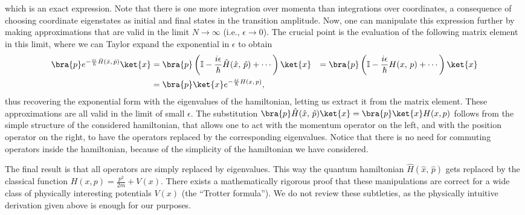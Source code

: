 which is an exact expression. Note that there is one more integration over momenta than integrations over coordinates, a consequence of choosing coordinate eigenstates as initial and final states in the transition amplitude. Now, one can manipulate this expression further by making approximations that are valid in the limit \(N \to \infty\) (i.e., \(\epsilon \to  0\)). The crucial point is the evaluation of the following matrix element in this limit, where we can Taylor expand the exponential in \(\epsilon\) to obtain
\[
    \begin{aligned}
        \bra{p} e^{-\frac{i\epsilon}{\hbar}\hat{H}(\hat{x},\,\hat{p})}\ket{x} & = \bra{p} \left(\mathbb{I} - \frac{i \epsilon}{\hbar} \hat{H}(\hat{x},\,\hat{p}) + \cdots \right) \ket{x}
                                                                              & = \bra{p} \left(\mathbb{I} - \frac{i \epsilon}{\hbar} H(x,\,p) + \cdots \right) \ket{x}                   \\
                                                                              & = \bra{p}\ket{x} e^{-\frac{i \epsilon}{\hbar} H(x,\,p)},
    \end{aligned}
\]
thus recovering the exponential form with the eigenvalues of the hamiltonian, letting us extract it from the matrix element. These approximations are all valid in the limit of small \(\epsilon\). The substitution \(\bra{p}\hat{H}(\hat{x},\,\hat{p})\ket{x} = \bra{p}\ket{x}H(x,p)\) follows from the simple structure of the considered hamiltonian, that allows one to act with the momentum operator on the left, and with the position operator on the right, to have the operators replaced by the corresponding eigenvalues. Notice that there is no need for commuting operators inside the hamiltonian, because of the simplicity of the hamiltonian
we have considered.

The final result is that all operators are simply replaced by eigenvalues. This way the quantum hamiltonian \(\hat{H}(\hat{x} ,\, \hat{p})\) gets replaced by the classical function \(H(x,p) = \frac{p^2}{2m} + V(x)\). There exists a mathematically rigorous proof that these manipulations are correct for a wide class of physically interesting potentials \(V(x)\) (the “Trotter formula”). We do not review these subtleties, as the physically intuitive derivation given above is enough for our purposes.

